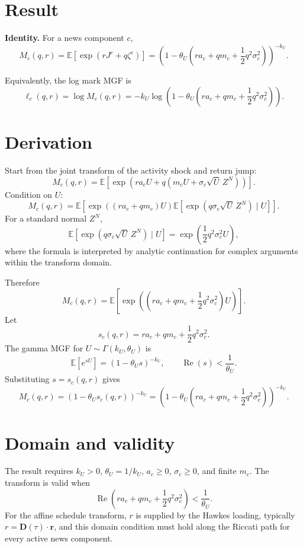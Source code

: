 \documentclass[11pt]{article}
\begin{document}
\section{Result}

\noindent\textbf{Identity.} For a news component \(c\),
\[
    M_c(q,r)
    =
    \mathbb E\left[\exp\left(rJ^c+q\zeta^c\right)\right]
    =
    \left(
        1-\theta_U\left(ra_c+qm_c+\frac{1}{2}q^2\sigma_c^2\right)
    \right)^{-k_U}.
\]

Equivalently, the log mark MGF is
\[
    \ell_c(q,r)
    =
    \log M_c(q,r)
    =
    -k_U\log\left(
        1-\theta_U\left(ra_c+qm_c+\frac{1}{2}q^2\sigma_c^2\right)
    \right).
\]

\section{Derivation}

Start from the joint transform of the activity shock and return jump:
\[
M_c(q,r)
=
\mathbb E\left[
    \exp\left(ra_cU+q\left(m_cU+\sigma_c\sqrt{U}\,Z^N\right)\right)
\right].
\]
Condition on \(U\):
\[
    M_c(q,r)
    =
    \mathbb E\left[
        \exp\left((ra_c+qm_c)U\right)
        \mathbb E\left[
            \exp\left(q\sigma_c\sqrt{U}\,Z^N\right)\mid U
        \right]
    \right].
\]
For a standard normal \(Z^N\),
\[
    \mathbb E\left[
        \exp\left(q\sigma_c\sqrt{U}\,Z^N\right)\mid U
    \right]
    =
    \exp\left(\frac{1}{2}q^2\sigma_c^2U\right),
\]
where the formula is interpreted by analytic continuation for complex
arguments within the transform domain.

Therefore
\[
    M_c(q,r)
    =
    \mathbb E\left[
        \exp\left(
            \left(ra_c+qm_c+\frac{1}{2}q^2\sigma_c^2\right)U
        \right)
    \right].
\]
Let
\[
    s_c(q,r)
    =
    ra_c+qm_c+\frac{1}{2}q^2\sigma_c^2.
\]
The gamma MGF for \(U\sim\Gamma(k_U,\theta_U)\) is
\[
    \mathbb E[e^{sU}]=(1-\theta_U s)^{-k_U},
    \qquad
    \operatorname{Re}(s)<\frac{1}{\theta_U}.
\]
Substituting \(s=s_c(q,r)\) gives
\[
    M_c(q,r)
    =
    \left(1-\theta_U s_c(q,r)\right)^{-k_U}
    =
    \left(
        1-\theta_U\left(ra_c+qm_c+\frac{1}{2}q^2\sigma_c^2\right)
    \right)^{-k_U}.
\]

\section{Domain and validity}

The result requires \(k_U>0\), \(\theta_U=1/k_U\), \(a_c\ge0\),
\(\sigma_c\ge0\), and finite \(m_c\).
The transform is valid when
\[
    \operatorname{Re}\left(
        ra_c+qm_c+\frac{1}{2}q^2\sigma_c^2
    \right)
    <
    \frac{1}{\theta_U}.
\]
For the affine schedule transform, \(r\) is supplied by the Hawkes loading,
typically \(r=\mathbf D(\tau)\cdot\mathbf r\), and this domain condition must
hold along the Riccati path for every active news component.
\end{document}
